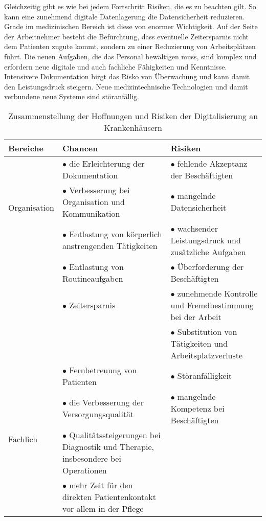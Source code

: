 Gleichzeitig gibt es wie bei jedem Fortschritt Risiken, die es zu beachten gilt. So kann eine zunehmend digitale Datenlagerung die Datensicherheit reduzieren. Grade im medizinischen Bereich ist diese von enormer Wichtigkeit. Auf der Seite der Arbeitnehmer besteht die Befürchtung, dass eventuelle Zeitersparnis nicht dem Patienten zugute kommt, sondern zu einer Reduzierung von Arbeitsplätzen führt. Die neuen Aufgaben, die das Personal bewältigen muss, sind komplex und erfordern neue digitale und auch fachliche Fähigkeiten und Kenntnisse. Intensivere Dokumentation birgt das Risko von Überwachung und kann damit den Leistungsdruck steigern. Neue medizintechnische Technologien und damit verbundene neue Systeme sind störanfällig. \parencite{braeutigam2017}
\begin{table}[ht]
	\begin{tabular}{l|p{}|p{}}
	\textbf{Bereiche}&\textbf{Chancen}&\textbf{Risiken}\\
	\hline
	\multirow{3}{*}{Organisation}
		&$\bullet$ die Erleichterung der Dokumentation &$\bullet$ fehlende Akzeptanz der Beschäftigten\\
		&$\bullet$ Verbesserung bei Organisation und Kommunikation &$\bullet$ mangelnde Datensicherheit\\
	\hline
	\multirow{7}{*}{Personal}
		&$\bullet$ Entlastung von körperlich anstrengenden Tätigkeiten &$\bullet$ wachsender Leistungsdruck und zusätzliche Aufgaben\\
		&$\bullet$ Entlastung von Routineaufgaben &$\bullet$ Überforderung der Beschäftigten\\
		&$\bullet$ Zeitersparnis&$\bullet$ zunehmende Kontrolle und Fremdbestimmung bei der Arbeit\\
		&&$\bullet$ Substitution von Tätigkeiten und Arbeitsplatzverluste\\
	\hline
	\multirow{6}{*}{Fachlich}
		&$\bullet$ Fernbetreuung von Patienten&$\bullet$ Störanfälligkeit\\
		&$\bullet$ die Verbesserung der Versorgungsqualität &$\bullet$ mangelnde Kompetenz bei Beschäftigten\\
		&$\bullet$ Qualitätssteigerungen bei Diagnostik und Therapie, insbesondere bei Operationen&\\
		&$\bullet$ mehr Zeit für den direkten Patientenkontakt vor allem in der Pflege&\\
	\end{tabular}
	\caption{Zusammenstellung der Hoffnungen und Risiken der Digitalisierung an Krankenhäusern \parencite{braeutigam2017}}
	\label{tab:hoffnung_risiken}
\end{table}\\
